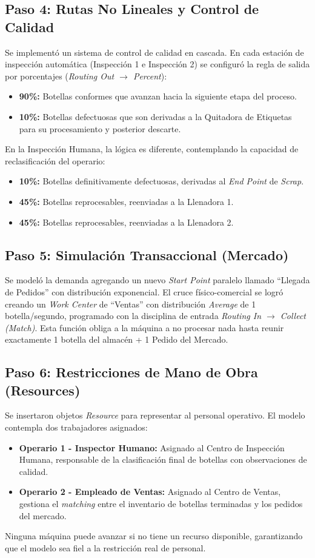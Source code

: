 \documentclass[12pt, a4paper]{article}
\begin{document}
\subsection{Paso 4: Rutas No Lineales y Control de Calidad}
Se implementó un sistema de control de calidad en cascada. En cada estación de inspección automática (Inspección 1 e Inspección 2) se configuró la regla de salida por porcentajes (\textit{Routing Out $\rightarrow$ Percent}):
\begin{itemize}
    \item \textbf{90\%:} Botellas conformes que avanzan hacia la siguiente etapa del proceso.
    \item \textbf{10\%:} Botellas defectuosas que son derivadas a la Quitadora de Etiquetas para su procesamiento y posterior descarte.
\end{itemize}

En la Inspección Humana, la lógica es diferente, contemplando la capacidad de reclasificación del operario:
\begin{itemize}
    \item \textbf{10\%:} Botellas definitivamente defectuosas, derivadas al \textit{End Point} de \textit{Scrap}.
    \item \textbf{45\%:} Botellas reprocesables, reenviadas a la Llenadora 1.
    \item \textbf{45\%:} Botellas reprocesables, reenviadas a la Llenadora 2.
\end{itemize}

\subsection{Paso 5: Simulación Transaccional (Mercado)}
Se modeló la demanda agregando un nuevo \textit{Start Point} paralelo llamado ``Llegada de Pedidos'' con distribución exponencial. El cruce físico-comercial se logró creando un \textit{Work Center} de ``Ventas'' con distribución \textit{Average} de 1 botella/segundo, programado con la disciplina de entrada \textit{Routing In $\rightarrow$ Collect (Match)}. Esta función obliga a la máquina a no procesar nada hasta reunir exactamente 1 botella del almacén + 1 Pedido del Mercado.

\subsection{Paso 6: Restricciones de Mano de Obra (Resources)}
Se insertaron objetos \textit{Resource} para representar al personal operativo. El modelo contempla dos trabajadores asignados:
\begin{itemize}
    \item \textbf{Operario 1 - Inspector Humano:} Asignado al Centro de Inspección Humana, responsable de la clasificación final de botellas con observaciones de calidad.
    \item \textbf{Operario 2 - Empleado de Ventas:} Asignado al Centro de Ventas, gestiona el \textit{matching} entre el inventario de botellas terminadas y los pedidos del mercado.
\end{itemize}
Ninguna máquina puede avanzar si no tiene un recurso disponible, garantizando que el modelo sea fiel a la restricción real de personal.
\end{document}
